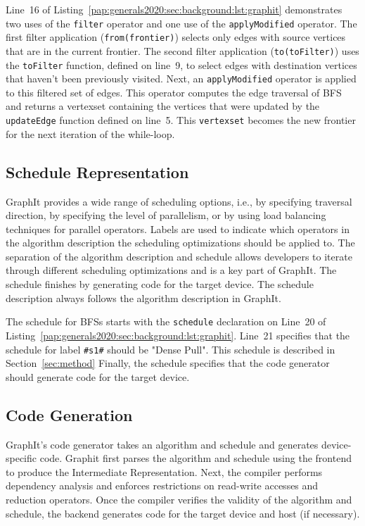 Line~16 of Listing~\ref{pap:generals2020:sec:background:lst:graphit} demonstrates two uses of the \lstinline[language=graphit]{filter} operator and one use of the \lstinline[language=graphit]{applyModified} operator. 
The first filter application (\lstinline[language=graphit]{from(frontier)}) selects only edges with source vertices that are in the current frontier. 
The second filter application (\lstinline[language=graphit]{to(toFilter)}) uses the \lstinline[language=graphit]{toFilter} function, defined on line~9, to select edges with destination vertices that haven't been previously visited.
Next, an \lstinline[language=graphit]{applyModified} operator is applied to this filtered set of edges.
This operator computes the edge traversal of BFS and returns a vertexset containing the vertices that were updated by the \lstinline[language=graphit]{updateEdge} function defined on line~5.
This \lstinline[language=graphit]{vertexset} becomes the new frontier for the next iteration of the while-loop.

\subsection{Schedule Representation}
GraphIt provides a wide range of scheduling options, i.e., by specifying traversal direction, by specifying the level of parallelism, or by using load balancing techniques for parallel operators.
Labels are used to indicate which operators in the algorithm description the scheduling optimizations should be applied to.
The separation of the algorithm description and schedule allows developers to iterate through different scheduling optimizations and is a key part of GraphIt.
The schedule finishes by generating code for the target device.
The schedule description always follows the algorithm description in GraphIt.

The schedule for BFSs starts with the \lstinline[language=graphit]{schedule} declaration on Line~20 of Listing~\ref{pap:generals2020:sec:background:lst:graphit}. Line~21 specifies that the schedule for label \lstinline[language=graphit]{#s1#} should be "Dense Pull". This schedule is described in Section~\ref{sec:method}
Finally, the schedule specifies that the code generator should generate code for the target device. 

\subsection{Code Generation}
GraphIt's code generator takes an algorithm and schedule and generates device-specific code.
Graphit first parses the algorithm and schedule using the frontend to produce the Intermediate Representation. 
Next, the compiler performs dependency analysis and enforces restrictions on read-write accesses and reduction operators. 
Once the compiler verifies the validity of the algorithm and schedule, the backend generates code for the target device and host (if necessary).
